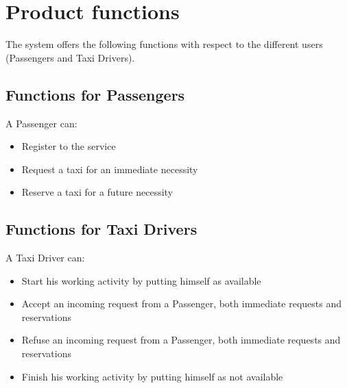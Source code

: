 \section{Product functions}
The system offers the following functions with respect to the different users (Passengers and Taxi Drivers).
\subsection{Functions for Passengers}
A Passenger can:
\begin{itemize}
\item Register to the service
\item Request a taxi for an immediate necessity
\item Reserve a taxi for a future necessity
\end{itemize}	
\subsection{Functions for Taxi Drivers}
A Taxi Driver can:
\begin{itemize}
\item Start his working activity by putting himself as available
\item Accept an incoming request from a Passenger, both immediate requests and reservations
\item Refuse an incoming request from a Passenger, both immediate requests and reservations
\item Finish his working activity by putting himself as not available
\end{itemize}